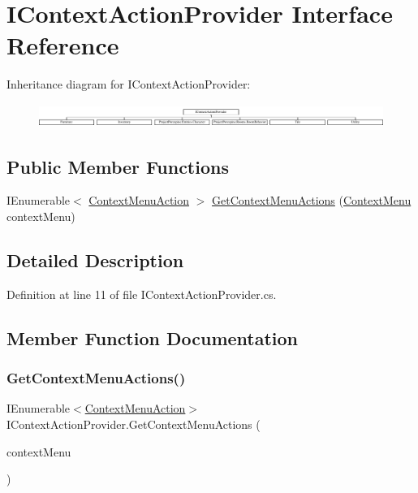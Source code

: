 \hypertarget{interface_i_context_action_provider}{}\section{I\+Context\+Action\+Provider Interface Reference}
\label{interface_i_context_action_provider}
Inheritance diagram for I\+Context\+Action\+Provider\+:\begin{figure}[H]
\begin{center}
\leavevmode
\includegraphics[height=0.761905cm]{interface_i_context_action_provider}
\end{center}
\end{figure}
\subsection*{Public Member Functions}
\begin{DoxyCompactItemize}
\item 
I\+Enumerable$<$ \hyperlink{class_context_menu_action}{Context\+Menu\+Action} $>$ \hyperlink{interface_i_context_action_provider_acb23b31fd7720af55c607a3c12634d1e}{Get\+Context\+Menu\+Actions} (\hyperlink{class_context_menu}{Context\+Menu} context\+Menu)
\end{DoxyCompactItemize}


\subsection{Detailed Description}


Definition at line 11 of file I\+Context\+Action\+Provider.\+cs.



\subsection{Member Function Documentation}
\mbox{\label{interface_i_context_action_provider_acb23b31fd7720af55c607a3c12634d1e}} 
\subsubsection{\texorpdfstring{Get\+Context\+Menu\+Actions()}{GetContextMenuActions()}}
{\footnotesize\ttfamily I\+Enumerable$<$\hyperlink{class_context_menu_action}{Context\+Menu\+Action}$>$ I\+Context\+Action\+Provider.\+Get\+Context\+Menu\+Actions (\begin{DoxyParamCaption}\item[{\hyperlink{class_context_menu}{Context\+Menu}}]{context\+Menu }\end{DoxyParamCaption})}



